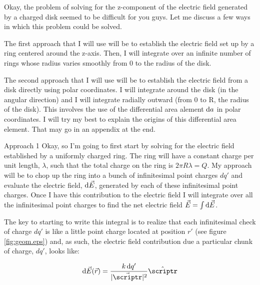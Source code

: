 \begin{homeworkProblem} 
    Okay, the problem of solving for the z-component of the electric
    field generated by a charged disk seemed to be difficult for you
    guys. Let me discuss a few ways in which this problem could be
    solved.
    
    The first approach that I will use will be to establish the
    electric field set up by a ring centered around the z-axis. Then, I
    will integrate over an infinite number of rings whose radius varies
    smoothly from 0 to the radius of the disk.

    The second approach that I will use will be to establish the
    electric field from a disk directly using polar coordinates. I will
    integrate around the disk (in the angular direction) and I will
    integrate radially outward (from 0 to R, the radius of the disk).
    This involves the use of the differential area alement $\mathop{}\!\mathrm{d} a$ in
    polar coordinates. I will try my best to explain the origins of this
    differential area element. That may go in an appendix at the end.

    \begin{homeworkSection}{Approach 1}
        Okay, so I'm going to first start by solving for the electric
        field established by a uniformly charged ring. The ring will
        have a constant charge per unit length, $\lambda$, such that the
        total charge on the ring is $2\pi R \lambda = Q$. My approach
        will be to chop up the ring into a bunch of infinitesimal point
        charges $dq'$ and evaluate the electric field, $\mathop{}\!\mathrm{d} \vec{E}$,
        generated by each of these infinitesimal point charges. Once I
        have this contribution to the electric field I will integrate
        over all the infinitesimal point charges to find the net
        electric field $\vec{E} = \int \mathop{}\!\mathrm{d} \vec{E}$. 

        The key to starting to write this integral is to realize that
        each infinitesimal check of charge $dq'$ is like a little point
        charge located at position $r'$ (see figure \ref{fig:geom.eps})
        and, as such, the electric field contribution due a particular
        chunk of charge, $dq'$, looks like:

        \[ \diff \vec{E}(\vec{r}) = \frac{k \diff q'}{|\vec{\scriptr}|^2}
        \hat{\scriptr} \]

    \end{homeworkSection}
\end{homeworkProblem}
